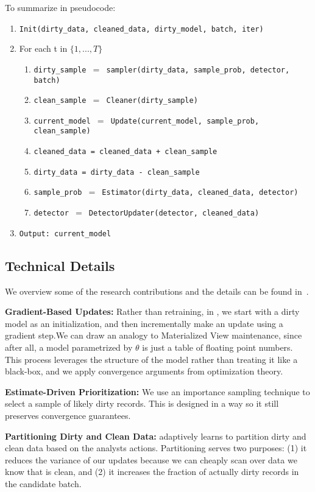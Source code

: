   \noindent To summarize in pseudocode:
  \begin{enumerate}[leftmargin=1em]\scriptsize\sloppy
  \item \texttt{Init(dirty\_data, cleaned\_data, dirty\_model, batch, iter)}
  \item For each t in $\{1,...,T\}$
  \begin{enumerate}
    \item \texttt{dirty\_sample $=$ sampler(dirty\_data, sample\_prob, detector, batch)}
    \item \texttt{clean\_sample $=$ Cleaner(dirty\_sample)}
    \item \texttt{current\_model $=$ Update(current\_model, sample\_prob, clean\_sample)}
    \item \texttt{cleaned\_data = cleaned\_data + clean\_sample}
    \item \texttt{dirty\_data = dirty\_data - clean\_sample}
    \item \texttt{sample\_prob $=$ Estimator(dirty\_data, cleaned\_data, detector)}
    \item \texttt{detector $=$ DetectorUpdater(detector, cleaned\_data)}
  \end{enumerate}
  \item \texttt{Output: current\_model}
  \end{enumerate}

\subsection{Technical Details}
We overview some of the research contributions and the details can be found in~\cite{activecleanarxiv}.

  \vspace{0.5em}

  \noindent\textbf{Gradient-Based Updates: } Rather than retraining, in \sys, we start with a dirty model as an initialization, and then incrementally make an update using a gradient step.We can draw an analogy to Materialized View maintenance, since after all, a model parametrized by $\theta$ is just a table of floating point numbers.
  This process leverages the structure of the model rather than treating it like a black-box, and we apply convergence arguments from optimization theory.

  \vspace{0.5em}

  \noindent\textbf{Estimate-Driven Prioritization: } We use an importance sampling technique to select a sample of likely dirty records. This is designed in a way so it still preserves convergence guarantees.

  \vspace{0.5em}

  \noindent\textbf{Partitioning Dirty and Clean Data: } \sys adaptively learns to partition dirty and clean data based on the analysts actions.
  Partitioning serves two purposes: (1) it reduces the variance of our updates because we can cheaply scan over data we know that is clean, and (2) it increases the fraction of actually dirty records in the candidate batch.
